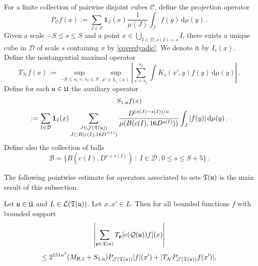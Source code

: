 {For a finite collection of pairwise disjoint cubes $\mathcal{C}$, define the projection operator
$$
    P_{\mathcal{C}}f(x) :=\sum_{J\in\mathcal{C}}\mathbf{1}_J(x) \frac{1}{\mu(J)}\int_J f(y) \, \mathrm{d}\mu(y)\,.
$$
Given a scale $-S \le s\le S$ and a point $x \in \bigcup_{I\in \mathcal{D}, s(I) = s} I$, there exists a unique cube in $\mathcal{D}$ of scale $s$ containing $x$ by \eqref{coverdyadic}. We denote it by $I_s(x)$. Define the nontangential maximal operator
\begin{equation}
    \label{eq TN def}
    T_{\mathcal{N}} f(x) := \sup_{-S \le s_1 < s_2 \le S} \sup_{x' \in I_{s_1}(x)} \left| \sum_{s = s_1}^{s_2}  \int K_s(x',y) f(y)  \, \mathrm{d}\mu(y) \right|\,.
\end{equation}
Define for each $\mathfrak u \in \mathfrak U$ the auxiliary operator
$$
    S_{1,\mathfrak u}f(x)
$$
\begin{equation}
    \label{eq def S op}
    :=\sum_{I\in\mathcal{D}} \mathbf{1}_{I}(x) \sum_{\substack{J\in \mathcal{J}(\mathfrak T(\mathfrak u))\\
    J\subset B(c(I), 16 D^{s(I)})}} \frac{D^{(s(J) - s(I))/a}}{\mu(B(c(I), 16D^{s(I)}))}\int_J |f(y)| \, \mathrm{d}\mu(y)\,.
\end{equation}
Define also the collection of balls
$$
    \mathcal{B} = \{B(c(I), D^{s + s(I)}) \ : \ I \in \mathcal{D}\,, 0 \le s \le S + 5\}\,.
$$

The following pointwise estimate for operators associated to sets $\mathfrak T(\mathfrak u)$ is the main result of this subsection.

\begin{lemma}
    \label{lem pointw tree estimate}
    Let $\mathfrak u \in \mathfrak U$ and $L \in \mathcal{L}(\mathfrak T(\mathfrak u))$. Let $x, x' \in L$.
    Then for all bounded functions $f$ with bounded support
    $$
        \left|\sum_{\mathfrak p \in \mathfrak T(\mathfrak u)} T_{\mathfrak p}[ e(\mathcal{Q}(\mathfrak u))f](x)\right|
    $$
    \begin{equation}
        \label{eq LJ ptwise}
        \leq 2^{151a^3}(M_{\mathcal{B},1}+S_{1,\mathfrak u})P_{\mathcal{J}(\mathfrak T(\mathfrak u))}|f|(x')+|T_{\mathcal{N}}P_{\mathcal{J}(\mathfrak T(\mathfrak u))}f(x')|,
    \end{equation}
\end{lemma}


}
